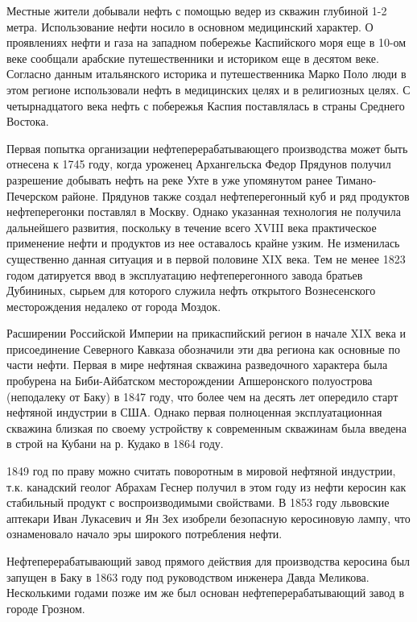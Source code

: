Местные жители добывали нефть с помощью ведер из скважин глубиной 1-2 метра.
Использование нефти носило в основном медицинский характер.
О проявлениях нефти и газа на западном побережье Каспийского моря еще в 10-ом веке сообщали арабские путешественники и историком еще в десятом веке.
Согласно данным итальянского историка и путешественника Марко Поло люди в этом регионе использовали нефть в медицинских целях и в религиозных целях.
С четырнадцатого века нефть с побережья Каспия поставлялась в страны Среднего Востока.

Первая попытка организации нефтеперерабатывающего производства может быть отнесена к 1745 году, когда уроженец Архангельска Федор Прядунов получил разрешение добывать нефть на реке Ухте в уже упомянутом ранее Тимано-Печерском районе.
Прядунов также создал нефтеперегонный куб и ряд продуктов нефтеперегонки поставлял в Москву.
Однако указанная технология не получила дальнейшего развития, поскольку в течение всего XVIII века практическое применение нефти и продуктов из нее оставалось крайне узким.
Не изменилась существенно данная ситуация и в первой половине XIX века.
Тем не менее 1823 годом датируется ввод в эксплуатацию нефтеперегонного завода братьев Дубининых, сырьем для которого служила нефть открытого Вознесенского месторождения недалеко от города Моздок.

Расширении Российской Империи на прикаспийский регион в начале XIX века и присоединение Северного Кавказа обозначили эти два региона как основные по части нефти.
Первая в мире нефтяная скважина разведочного характера была пробурена на Биби-Айбатском месторождении Апшеронского полуострова (неподалеку от Баку) в 1847 году, что более чем на десять лет опередило старт нефтяной индустрии в США.
Однако первая полноценная эксплуатационная скважина близкая по своему устройству к современным скважинам была введена в строй на Кубани на р.
Кудако в 1864 году.

1849 год по праву можно считать поворотным в мировой нефтяной индустрии, т.к. канадский геолог Абрахам Геснер получил в этом году из нефти керосин как стабильный продукт с воспроизводимыми свойствами.
В 1853 году львовские аптекари Иван Лукасевич и Ян Зех изобрели безопасную керосиновую лампу, что ознаменовало начало эры широкого потребления нефти.

Нефтеперерабатывающий завод прямого действия для производства керосина был запущен в Баку в 1863 году под руководством инженера Давда Меликова.
Несколькими годами позже им же был основан нефтеперерабатывающий завод в городе Грозном.

